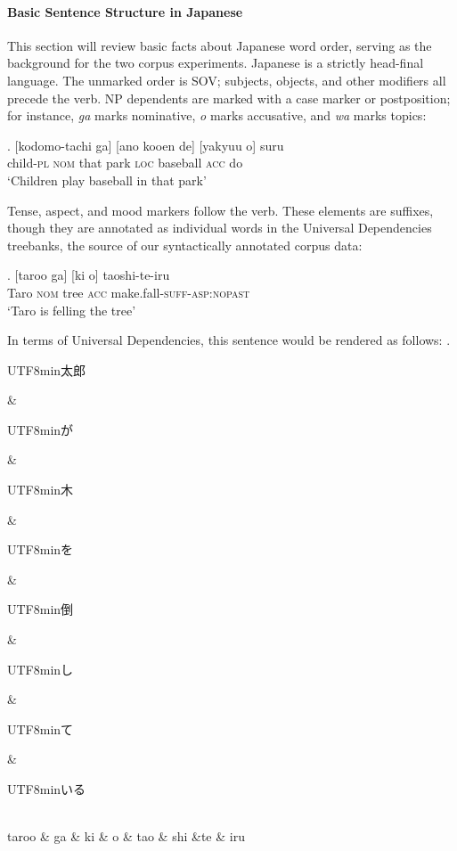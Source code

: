 \documentclass[11pt,a4paper]{article}
\newcommand{\japanese}[1]{\begin{CJK}{UTF8}{min}#1\end{CJK}}
\begin{document}
\paragraph{Basic Sentence Structure in Japanese}
This section will review basic facts about Japanese word order, serving as the background for the two corpus experiments.
Japanese is a strictly head-final language. The unmarked order is SOV; subjects, objects, and other modifiers all precede the verb.
NP dependents are marked with a case marker or postposition; for instance, \emph{ga} marks nominative, \emph{o} marks accusative, and \emph{wa} marks topics:


\exg. [kodomo-tachi ga] [ano kooen de] [yakyuu o] suru \\
child-\textsc{pl} \textsc{nom} that park \textsc{loc} baseball \textsc{acc} do \\
`Children play baseball in that park' \citep[p. 118]{iwasaki2013japanese}

Tense, aspect, and mood markers follow the verb.
These elements are suffixes, though they are annotated as individual words in the Universal Dependencies \citep{nivre2019universal} treebanks, the source of our syntactically annotated corpus data:

\exg. [taroo ga] [ki o] taoshi-te-iru \\
Taro \textsc{nom} tree \textsc{acc} make.fall-\textsc{suff}-\textsc{asp:nopast} \\
`Taro is felling the tree' \citep[p. 138]{iwasaki2013japanese} \label{ex:taro-tree}

In terms of Universal Dependencies, this sentence would be rendered as follows:
\ex.
\begin{dependency}[theme = simple]
   \begin{deptext}[column sep=1em]
          \japanese{太郎} \& \japanese{が} \& \japanese{木} \& \japanese{を} \& \japanese{倒} \& \japanese{し} \& \japanese{て} \& \japanese{いる} \\
          taroo \& ga \& ki \& o \& tao \& shi \&te \& iru \\ 
   \end{deptext}
\end{dependency}\label{ex:taro-tree-tree}
\end{document}
